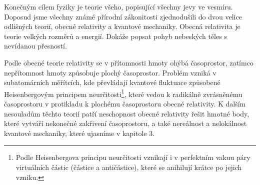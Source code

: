 Konečným cílem fyziky je teorie všeho, popisující všechny jevy ve vesmíru. Doposud jsme všechny známé přírodní zákonitosti zjednodušili do dvou velice odlišných teorií, obecné relativity a kvantové mechaniky. Obecná relativita je teorie velkých rozměrů a energií. Dokáže popsat pohyb nebeských těles s nevídanou přesností.

Podle obecné teorie relativity se v přítomnosti hmoty ohýbá časoprostor, zatímco nepřítomnost hmoty způsobuje plochý časoprostor. Problém vzniká v subatomárních měřítcích, kde převládají kvantové fluktuace způsobené Heisenbergovým principem neurčitosti\footnote[3]{Podle Heisenbergova principu neurčitosti vznikají i v perfektním vakuu páry virtuálních částic (částice a antičástice), které se anihilují krátce po jejich vzniku.}, které vedou k radikálně zvrásněnému časoprostoru v protikladu k plo\-chému časoprostoru obecné relativity. K dalším nesouladům těchto teorií patří neschopnost obecné relativity řešit hmotné body, které vytváří nekonečné zakřivení časoprostoru, a také nereálnost a nelokálnost kvantové mechaniky, které ujasníme v kapitole 3.

